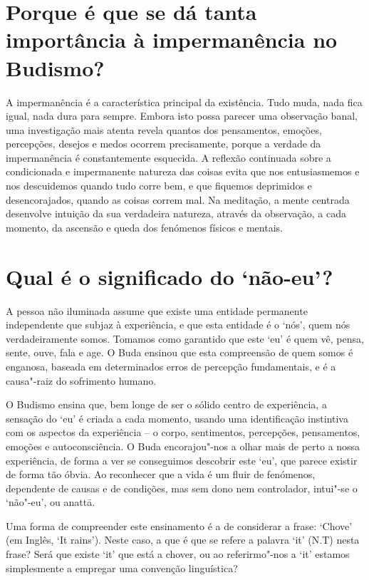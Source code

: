 \section{Porque é que se dá tanta importância à impermanência no Budismo?}

A impermanência é a característica principal da existência. Tudo muda,
nada fica igual, nada dura para sempre. Embora isto possa parecer uma
observação banal, uma investigação mais atenta revela quantos dos
pensamentos, emoções, percepções, desejos e medos ocorrem precisamente,
porque a verdade da impermanência é constantemente esquecida. A reflexão
continuada sobre a condicionada e impermanente natureza das coisas evita
que nos entusiasmemos e nos descuidemos quando tudo corre bem, e que
fiquemos deprimidos e desencorajados, quando as coisas correm mal. Na
meditação, a mente centrada desenvolve intuição da sua verdadeira
natureza, através da observação, a cada momento, da ascensão e queda dos
fenómenos físicos e mentais.

\section{Qual é o significado do `não-eu'?}

A pessoa não iluminada assume que existe uma entidade permanente
independente que subjaz à experiência, e que esta entidade é o `nós',
quem nós verdadeiramente somos. Tomamos como garantido que este `eu' é
quem vê, pensa, sente, ouve, fala e age. O Buda ensinou que esta
compreensão de quem somos é enganosa, baseada em determinados erros de
percepção fundamentais, e é a causa"-raiz do sofrimento humano.

O Budismo ensina que, bem longe de ser o sólido centro de experiência, a
sensação do `eu' é criada a cada momento, usando uma identificação
instintiva com os aspectos da experiência -- o corpo, sentimentos,
percepções, pensamentos, emoções e autoconsciência. O Buda
encorajou"-nos a olhar mais de perto a nossa experiência, de forma a ver
se conseguimos descobrir este `eu', que parece existir de forma tão
óbvia. Ao reconhecer que a vida é um fluir de fenómenos, dependente de
causas e de condições, mas sem dono nem controlador, intui"-se o
`não"-eu', ou anattā.

Uma forma de compreender este ensinamento é a de considerar a frase:
`Chove' (em Inglês, `It rains'). Neste caso, a que é que se refere a
palavra `it' (N.T) nesta frase? Será que existe `it' que está a chover,
ou ao referirmo"-nos a `it' estamos simplesmente a empregar uma convenção
linguística?

